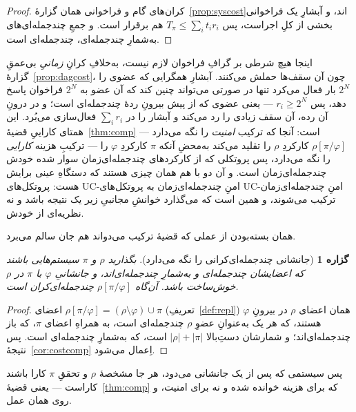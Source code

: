 \documentclass[10pt,oneside,openany]{book}
\theoremstyle{accentdef}
\theoremstyle{accentplain}
\newtheorem{proposition}[definition]{گزاره}
\begin{document}
\begin{proof}
کران‌های گام و فراخوانی همان گزارهٔ~\ref{prop:syscost}اند، و آبشارِ یک
فراخوانی بخشی از کلِ اجراست، پس $T_\pi \le \sum_i t_i r_i$ هم برقرار است. و
جمعِ چندجمله‌ای‌های به‌شمارِ چندجمله‌ای، چندجمله‌ای است.
\end{proof}

اینجا هیچ شرطی بر گرافِ فراخوان لازم نیست، به‌خلافِ کرانِ \emph{زمانیِ}
بی‌عمقِ گزارهٔ~\ref{prop:dagcost}، چون آن سقف‌ها حملش می‌کنند. آبشارِ
همگرایی که عضوی را $2^N$ بار فعال می‌کرد تنها در صورتی می‌تواند چنین کند که
آن عضو به $2^N$ فراخوان پاسخ دهد، پس $r_i \ge 2^N$ --- یعنی عضوی که از پیش
بیرونِ ردهٔ چندجمله‌ای است؛ و در درونِ آن رده، آن سقف زیادی را رد می‌کند و
آبشار را در $\sum_i r_i$ فعال‌سازی می‌بُرد. این همتای کاراییِ
قضیهٔ~\ref{thm:comp} است: آنجا که ترکیب \emph{امنیت} را نگه می‌دارد ---
$\rho[\pi/\varphi]$ کارکردِ $\rho$ را تقلید می‌کند به‌محضِ آنکه $\pi$
کارکردِ $\varphi$ را --- ترکیبِ هزینه \emph{کارایی} را نگه می‌دارد، پس
پروتکلی که از کارکردهای چندجمله‌ای‌زمان سوار شده خودش چندجمله‌ای‌زمان است.
و آن دو با هم همان چیزی هستند که دستگاهِ عینی برایش هست:
پروتکل‌های UC-امنِ چندجمله‌ای‌زمان به پروتکل‌های UC-امنِ چندجمله‌ای‌زمان
ترکیب می‌شوند، و همین است که می‌گذارد خوانشِ مجانبیِ زیر یک نتیجه باشد و نه
نظریه‌ای از خودش.

همان بسته‌بودن از عملی که قضیهٔ ترکیب می‌دواند هم جان سالم می‌برد.

\begin{proposition}[جانشانی چندجمله‌ای‌کرانی را نگه می‌دارد]\label{prop:replpoly}
بگذارید $\rho$ و $\pi$ سیستم‌هایی باشند که اعضایشان چندجمله‌ای و به‌شمارِ
چندجمله‌ای‌اند، و جانشانیِ $\varphi$ با $\pi$ در $\rho$ خوش‌ساخت باشد.
آن‌گاه $\rho[\pi/\varphi]$ چندجمله‌ای‌کران است.
\end{proposition}

\begin{proof}
اعضای $\rho[\pi/\varphi] = (\rho \setminus \varphi) \cup \pi$
(تعریفِ~\ref{def:repl}) همان اعضای $\rho$ در بیرونِ $\varphi$ هستند، که هر
یک به‌عنوانِ عضوِ $\rho$ چندجمله‌ای است، به همراهِ اعضای $\pi$، که باز
چندجمله‌ای‌اند؛ و شمارشان دستِ‌بالا $\lvert\rho\rvert + \lvert\pi\rvert$
است، که به‌شمارِ چندجمله‌ای است. پس نتیجهٔ~\ref{cor:costcomp} اِعمال
می‌شود.
\end{proof}

پس سیستمی که پس از یک جانشانی می‌دود، هر جا مشخصهٔ $\rho$ و تحققِ $\pi$ کارا
باشند کاراست --- یعنی قضیهٔ~\ref{thm:comp} که برای هزینه خوانده شده و نه
برای امنیت، و روی همان عمل.
\end{document}
